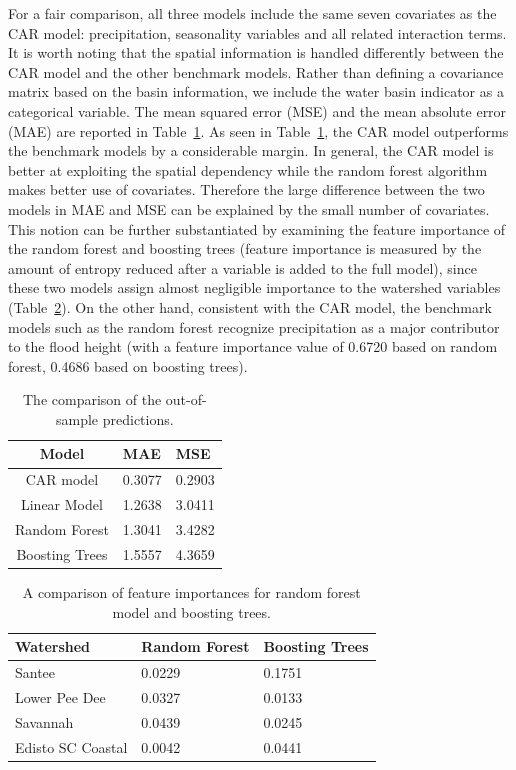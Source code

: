 \documentclass{svjour3}
\renewcommand\hl[1]{#1}
\begin{document}
For a fair comparison, all three models include the same seven covariates as the CAR model: precipitation, seasonality variables and all related interaction terms.
It is worth noting that the spatial information is handled differently between the CAR model and the other benchmark models.
Rather than defining a covariance matrix based on the basin information, we include the water basin indicator as a  categorical variable.
The mean squared error (MSE) and the mean absolute error (MAE) are reported in Table~\ref{com_model_fit}.
As seen in Table~\ref{com_model_fit}, the CAR model outperforms the benchmark models by a considerable margin.
\hl{In general, the CAR model is better at exploiting the spatial dependency while the random forest algorithm makes better use of covariates.
Therefore the large difference between the two models in MAE and MSE can be explained by the small number of covariates.}
This notion can be \hl{further} substantiated by examining the feature importance of the random forest and boosting trees (feature importance  is  measured by the amount of entropy reduced after a variable is added to the full model), since these two models assign almost negligible importance to the watershed variables (Table~\ref{com_model_fit_trees}).
 On the other hand, consistent with the CAR model, the benchmark models such as the random forest recognize  precipitation as a major contributor to the flood  height (with a feature importance value of 0.6720 based on random forest, 0.4686 based on boosting trees).

\begin{table}[htbp]
\caption{The comparison of the out-of-sample predictions.}
\centering
\begin{tabular}{|c|l|l|}
\hline
Model &  MAE &   MSE \\ \hline
CAR model & 0.3077 &0.2903  \\ \hline
Linear Model &1.2638 &3.0411 \\ \hline
Random Forest &1.3041 & 3.4282  \\ \hline
Boosting Trees &1.5557 &4.3659 \\ \hline
\end{tabular}
\label{com_model_fit}
\end{table}

\begin{table}[htbp]
\caption{A comparison of feature importances for random forest model  and boosting trees.}
\centering
\begin{tabular}{|l|l|l|}
\hline
Watershed &  Random Forest &   Boosting Trees \\ \hline
Santee & 0.0229  & 0.1751\\ \hline
Lower Pee Dee & 0.0327 & 0.0133\\ \hline
Savannah  &0.0439   &0.0245\\ \hline
Edisto SC Coastal  &0.0042 &0.0441 \\ \hline
\end{tabular}
\label{com_model_fit_trees}
\end{table}
\end{document}
